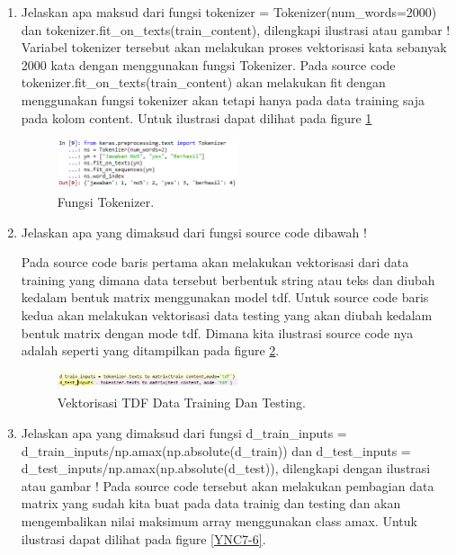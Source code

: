 \begin{enumerate}
\item Jelaskan apa maksud dari fungsi tokenizer = Tokenizer(num\_words=2000) dan tokenizer.fit\_on\_texts(train\_content), dilengkapi ilustrasi atau gambar !
	\subitem Variabel tokenizer tersebut akan melakukan proses vektorisasi kata sebanyak 2000 kata dengan menggunakan fungsi Tokenizer. Pada source code tokenizer.fit\_on\_texts(train\_content) akan melakukan fit dengan menggunakan fungsi tokenizer akan tetapi hanya pada data training saja pada kolom content. Untuk ilustrasi dapat dilihat pada figure \ref{YNC7-4}

	\begin{figure}[!htbp!]
		\centerline{\includegraphics[width=0.5\textwidth]{figures/YN/Chapter7/YNC7-4.png}}
		\caption{Fungsi Tokenizer.}
		\label{YNC7-4}
	\end{figure}

\item Jelaskan apa yang dimaksud dari fungsi source code dibawah !
	
	\subitem Pada source code baris pertama akan melakukan vektorisasi dari data training yang dimana data tersebut berbentuk string atau teks dan diubah kedalam bentuk matrix menggunakan model tdf. Untuk source code baris kedua akan melakukan vektorisasi data testing yang akan diubah kedalam bentuk matrix dengan mode tdf. Dimana kita ilustrasi source code nya adalah seperti yang ditampilkan pada figure \ref{YNC7-5}.

	\begin{figure}[!htbp!]
		\centerline{\includegraphics[width=0.5\textwidth]{figures/YN/Chapter7/YNC7-5.png}}
		\caption{Vektorisasi TDF Data Training Dan Testing.}
		\label{YNC7-5}
	\end{figure}

\item Jelaskan apa yang dimaksud dari fungsi d\_train\_inputs = d\_train\_inputs/np.amax(np.absolute(d\_train)) dan  d\_test\_inputs = d\_test\_inputs/np.amax(np.absolute(d\_test)), dilengkapi dengan ilustrasi atau gambar !
	\subitem Pada source code tersebut akan melakukan pembagian data matrix yang sudah kita buat pada data trainig dan testing dan akan mengembalikan nilai maksimum array menggunakan class amax. Untuk ilustrasi dapat dilihat pada figure \ref{YNC7-6}.


\end{enumerate}

